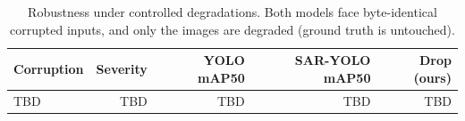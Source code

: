 \begin{table}[t]
\centering
\caption{Robustness under controlled degradations. Both models face byte-identical corrupted inputs, and only the images are degraded (ground truth is untouched).}
\label{tab:robustness}
\begin{tabular}{lrrrr}
\toprule
Corruption & Severity & YOLO mAP50 & SAR-YOLO mAP50 & Drop (ours) \\
\midrule
TBD & TBD & TBD & TBD & TBD \\
\bottomrule
\end{tabular}
\end{table}
